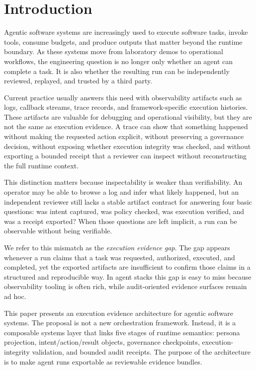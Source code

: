 \section{Introduction}

Agentic software systems are increasingly used to execute software tasks, invoke tools, consume budgets, and produce outputs that matter beyond the runtime boundary. As these systems move from laboratory demos to operational workflows, the engineering question is no longer only whether an agent can complete a task. It is also whether the resulting run can be independently reviewed, replayed, and trusted by a third party.

Current practice usually answers this need with observability artifacts such as logs, callback streams, trace records, and framework-specific execution histories. These artifacts are valuable for debugging and operational visibility, but they are not the same as execution evidence. A trace can show that something happened without making the requested action explicit, without preserving a governance decision, without exposing whether execution integrity was checked, and without exporting a bounded receipt that a reviewer can inspect without reconstructing the full runtime context.

This distinction matters because inspectability is weaker than verifiability. An operator may be able to browse a log and infer what likely happened, but an independent reviewer still lacks a stable artifact contract for answering four basic questions: was intent captured, was policy checked, was execution verified, and was a receipt exported? When those questions are left implicit, a run can be observable without being verifiable.

We refer to this mismatch as the \emph{execution evidence gap}. The gap appears whenever a run claims that a task was requested, authorized, executed, and completed, yet the exported artifacts are insufficient to confirm those claims in a structured and reproducible way. In agent stacks this gap is easy to miss because observability tooling is often rich, while audit-oriented evidence surfaces remain ad hoc.

This paper presents an execution evidence architecture for agentic software systems. The proposal is not a new orchestration framework. Instead, it is a composable systems layer that links five stages of runtime semantics: persona projection, intent/action/result objects, governance checkpoints, execution-integrity validation, and bounded audit receipts. The purpose of the architecture is to make agent runs exportable as reviewable evidence bundles.

